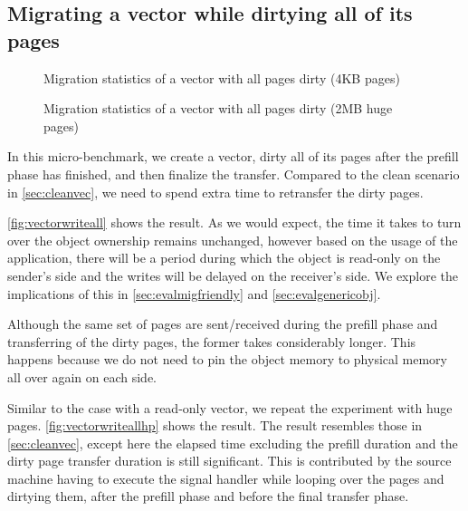 \subsection{Migrating a vector while dirtying all of its pages}
\label{sec:dirtyvector}
\begin{figure}[tp]
    \begin{center}
        
    \end{center}
    \caption{Migration statistics of a vector with all pages dirty (4KB pages)}
    \label{fig:vectorwriteall}
\end{figure}

\begin{figure}[tp]
    \begin{center}
        
    \end{center}
    \caption{Migration statistics of a vector with all pages dirty (2MB huge pages)}
    \label{fig:vectorwriteallhp}
\end{figure}

In this micro-benchmark, we create a vector, dirty all of its pages after the
prefill phase has finished, and then finalize the transfer. Compared to the
clean scenario in \autoref{sec:cleanvec}, we need to spend extra time to
retransfer the dirty pages.

\autoref{fig:vectorwriteall} shows the result. As we would expect, the time it takes to turn over
the object ownership remains unchanged, however based on the usage of the
application, there will be a period during which the object is read-only on the
sender's side and the writes will be delayed on the receiver's side. We
explore the implications of this in \autoref{sec:evalmigfriendly} and
\autoref{sec:evalgenericobj}.

Although the same set of pages are sent/received during the prefill phase and
transferring of the dirty pages, the former takes considerably longer. This
happens because we do not need to pin the object memory to physical memory all
over again on each side.

Similar to the case with a read-only vector, we repeat the experiment with huge
pages. \autoref{fig:vectorwriteallhp} shows the result. The result resembles
those in \autoref{sec:cleanvec}, except here the elapsed time excluding the
prefill duration and the dirty page transfer duration is still significant. This
is contributed by the source machine having to execute the signal
handler while looping over the pages and dirtying them, after the
prefill phase and before the final transfer phase.


